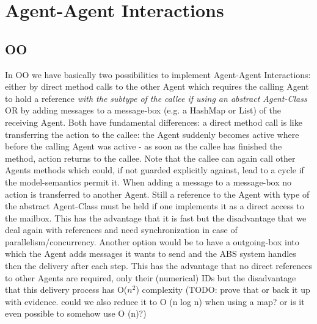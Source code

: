 \chapter{Agent-Agent Interactions}

\section{OO}
In OO we have basically two possibilities to implement Agent-Agent Interactions: either by direct method calls to the other Agent which requires the calling Agent to hold a reference \textit{with the subtype of the callee if using an abstract Agent-Class} OR by adding messages to a message-box (e.g. a HashMap or List) of the receiving Agent. Both have fundamental differences: a direct method call is like transferring the action to the callee: the Agent suddenly becomes active where before the calling Agent was active - as soon as the callee has finished the method, action returns to the callee. Note that the callee can again call other Agents methods which could, if not guarded explicitly against, lead to a cycle if the model-semantics permit it.
When adding a message to a message-box no action is transferred to another Agent. Still a reference to the Agent with type of the abstract Agent-Class must be held if one implements it as a direct access to the mailbox. This has the advantage that it is fast but the disadvantage that we deal again with references and need synchronization in case of parallelism/concurrency. Another option would be to have a outgoing-box into which the Agent adds messages it wants to send and the ABS system handles then the delivery after each step. This has the advantage that no direct references to other Agents are required, only their (numerical) IDs but the disadvantage that this delivery process has O($n^2$) complexity (TODO: prove that or back it up with evidence. could we also reduce it to O (n log n) when using a map? or is it even possible to somehow use O (n)?)

